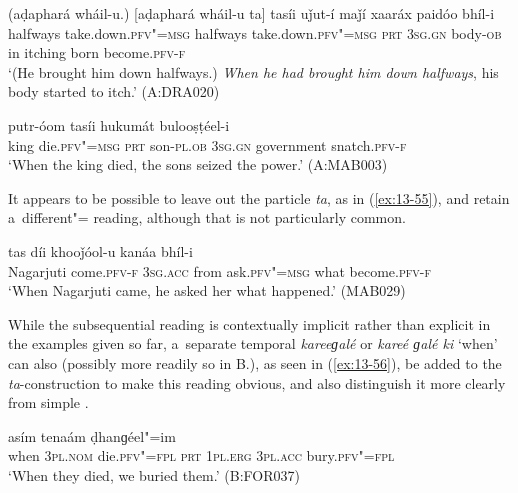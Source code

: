 \begin{exe}
\ex
\label{ex:13-53}
\gll (aḍaphará wháil-u.) [aḍaphará wháil-u ta] tasíi uǰut-í maǰí xaaráx paidóo bhíl-i \\
halfways take.down.\textsc{pfv"=msg} halfways  take.down.\textsc{pfv"=msg } \textsc{prt} \textsc{3sg.gn} body-\textsc{ob} in itching born become.\textsc{pfv-f} \\
\glt `(He brought him down halfways.) \textit{When he had brought him down halfways}, his body started to itch.' (A:DRA020)

\ex
\label{ex:13-54}
 putr-óom tasíi hukumát bulooṣṭéel-i \\
king die.\textsc{pfv"=msg} \textsc{prt} son-\textsc{pl.ob} \textsc{3sg.gn}  government snatch.\textsc{pfv-f} \\
\glt `When the king died, the sons seized the power.' (A:MAB003)
\end{exe}

It appears to be possible to leave out the particle \textit{ta}, as in (\ref{ex:13-55}), and retain a~different"= reading, although that is not particularly common.

\begin{exe}
\ex
\label{ex:13-55}
 tas díi khooǰóol-u kanáa bhíl-i \\
Nagarjuti come.\textsc{pfv-f} \textsc{3sg.acc} from ask.\textsc{pfv"=msg}  what become.\textsc{pfv-f} \\
\glt `When Nagarjuti came, he asked her what happened.' (MAB029) 
\end{exe}

While the subsequential reading is contextually implicit rather than explicit in the examples given so far, a~separate temporal  \textit{kareeɡalé} or \textit{kareé ɡalé ki} `when' can also (possibly more readily so in B.), as seen in (\ref{ex:13-56}), be added to the \textit{ta}-construction to make this reading obvious, and also distinguish it more clearly from simple .

\begin{exe}
\ex
\label{ex:13-56}
 asím tenaám ḍhanɡéel"=im \\
when \textsc{3pl.nom} die.\textsc{pfv"=fpl} \textsc{prt} \textsc{1pl.erg} \textsc{3pl.acc} bury.\textsc{pfv"=fpl} \\
\glt `When they died, we buried them.' (B:FOR037) 
\end{exe}

